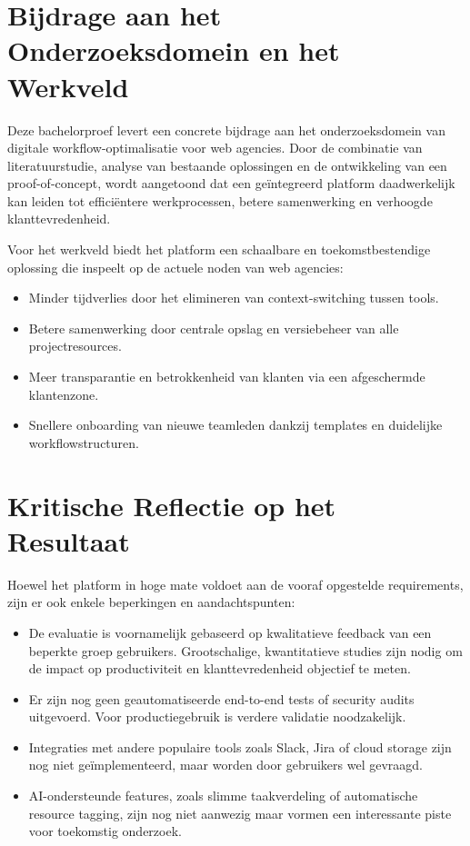 \section{Bijdrage aan het Onderzoeksdomein en het Werkveld}

Deze bachelorproef levert een concrete bijdrage aan het onderzoeksdomein van digitale workflow-optimalisatie voor web agencies. Door de combinatie van literatuurstudie, analyse van bestaande oplossingen en de ontwikkeling van een proof-of-concept, wordt aangetoond dat een geïntegreerd platform daadwerkelijk kan leiden tot efficiëntere werkprocessen, betere samenwerking en verhoogde klanttevredenheid.

Voor het werkveld biedt het platform een schaalbare en toekomstbestendige oplossing die inspeelt op de actuele noden van web agencies:
\begin{itemize}
    \item Minder tijdverlies door het elimineren van context-switching tussen tools.
    \item Betere samenwerking door centrale opslag en versiebeheer van alle projectresources.
    \item Meer transparantie en betrokkenheid van klanten via een afgeschermde klantenzone.
    \item Snellere onboarding van nieuwe teamleden dankzij templates en duidelijke workflowstructuren.
\end{itemize}

\section{Kritische Reflectie op het Resultaat}

Hoewel het platform in hoge mate voldoet aan de vooraf opgestelde requirements, zijn er ook enkele beperkingen en aandachtspunten:
\begin{itemize}
    \item De evaluatie is voornamelijk gebaseerd op kwalitatieve feedback van een beperkte groep gebruikers. Grootschalige, kwantitatieve studies zijn nodig om de impact op productiviteit en klanttevredenheid objectief te meten.
    \item Er zijn nog geen geautomatiseerde end-to-end tests of security audits uitgevoerd. Voor productiegebruik is verdere validatie noodzakelijk.
    \item Integraties met andere populaire tools zoals Slack, Jira of cloud storage zijn nog niet geïmplementeerd, maar worden door gebruikers wel gevraagd.
    \item AI-ondersteunde features, zoals slimme taakverdeling of automatische resource tagging, zijn nog niet aanwezig maar vormen een interessante piste voor toekomstig onderzoek.
\end{itemize}

